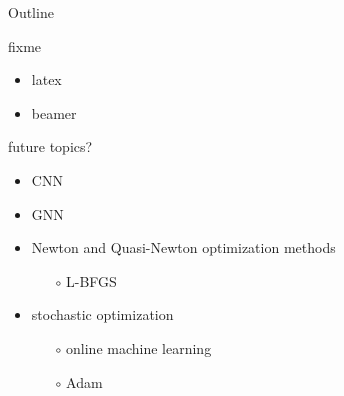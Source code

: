 \documentclass[xcolor={svgnames},
               hyperref={colorlinks,citecolor=DeepPink4,linkcolor=FireBrick,urlcolor=Maroon}]
               {beamer}
\begin{document}
\begin{frame}{Outline}
\end{frame}


\begin{frame}{fixme}

\begin{itemize}
\item latex
\item beamer
\end{itemize}
\end{frame}


\begin{frame}{future topics?}

\begin{itemize}
\item CNN
\item GNN
\item Newton and Quasi-Newton optimization methods
    \begin{itemize}
    \item[$\circ$] L-BFGS
    \end{itemize}
\item stochastic optimization
    \begin{itemize}
    \item[$\circ$] online machine learning
    \item[$\circ$] Adam
    \end{itemize}
\end{itemize}
\end{frame}
\end{document}

